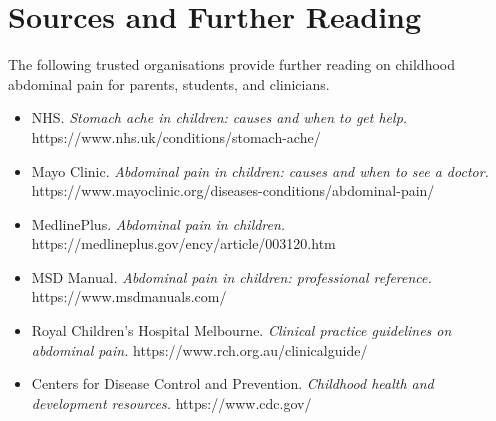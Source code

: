 \section*{Sources and Further Reading}
The following trusted organisations provide further reading on childhood abdominal pain for parents, students, and clinicians.

\begin{itemize}
    \item NHS. \textit{Stomach ache in children: causes and when to get help.} https://www.nhs.uk/conditions/stomach-ache/
    \item Mayo Clinic. \textit{Abdominal pain in children: causes and when to see a doctor.} https://www.mayoclinic.org/diseases-conditions/abdominal-pain/
    \item MedlinePlus. \textit{Abdominal pain in children.} https://medlineplus.gov/ency/article/003120.htm
    \item MSD Manual. \textit{Abdominal pain in children: professional reference.} https://www.msdmanuals.com/
    \item Royal Children's Hospital Melbourne. \textit{Clinical practice guidelines on abdominal pain.} https://www.rch.org.au/clinicalguide/
    \item Centers for Disease Control and Prevention. \textit{Childhood health and development resources.} https://www.cdc.gov/
\end{itemize}

